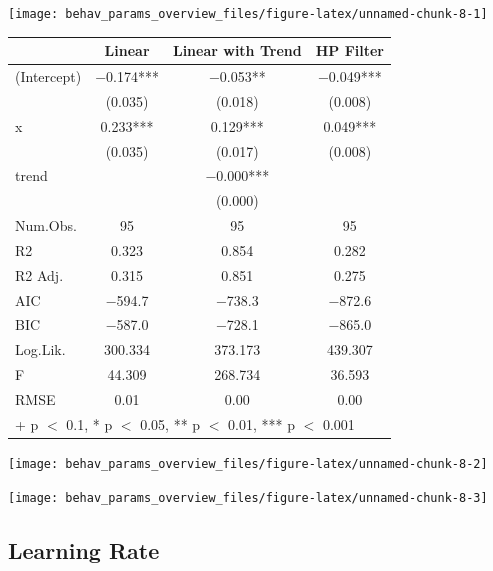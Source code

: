 \documentclass[
]{article}
\begin{document}
\begin{center}\texttt{[image: behav\_params\_overview\_files/figure-latex/unnamed-chunk-8-1]} \end{center}

\begin{table}
\centering
\begin{tabular}[t]{lccc}
\toprule
  & Linear & Linear with Trend & HP Filter\\
\midrule
(Intercept) & \num{-0.174}*** & \num{-0.053}** & \num{-0.049}***\\
 & (\num{0.035}) & (\num{0.018}) & (\num{0.008})\\
x & \num{0.233}*** & \num{0.129}*** & \num{0.049}***\\
 & (\num{0.035}) & (\num{0.017}) & (\num{0.008})\\
trend &  & \num{-0.000}*** & \\
 &  & (\num{0.000}) & \\
\midrule
Num.Obs. & \num{95} & \num{95} & \num{95}\\
R2 & \num{0.323} & \num{0.854} & \num{0.282}\\
R2 Adj. & \num{0.315} & \num{0.851} & \num{0.275}\\
AIC & \num{-594.7} & \num{-738.3} & \num{-872.6}\\
BIC & \num{-587.0} & \num{-728.1} & \num{-865.0}\\
Log.Lik. & \num{300.334} & \num{373.173} & \num{439.307}\\
F & \num{44.309} & \num{268.734} & \num{36.593}\\
RMSE & \num{0.01} & \num{0.00} & \num{0.00}\\
\bottomrule
\multicolumn{4}{l}{\rule{0pt}{1em}+ p $<$ 0.1, * p $<$ 0.05, ** p $<$ 0.01, *** p $<$ 0.001}\\
\end{tabular}
\end{table}

\begin{center}\texttt{[image: behav\_params\_overview\_files/figure-latex/unnamed-chunk-8-2]} \end{center}

\begin{center}\texttt{[image: behav\_params\_overview\_files/figure-latex/unnamed-chunk-8-3]} \end{center}

\subsection{Learning Rate}\label{learning-rate}
\end{document}
